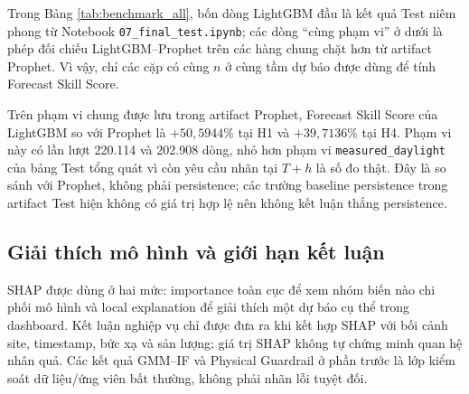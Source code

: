 \documentclass[12pt,a4paper]{article}
\begin{document}
\begin{table}[H]
\centering
\caption{Kết quả benchmark trên Test và phạm vi chung của LightGBM MAE và Prophet. Các số liệu được đọc từ artifact hiện hành và được đối chiếu với output notebook đã lưu.}
\label{tab:benchmark_all}
\small
{}
\end{table}

Trong Bảng \ref{tab:benchmark_all}, bốn dòng LightGBM đầu là kết quả Test niêm phong từ Notebook \texttt{07\_final\_test.ipynb}; các dòng ``cùng phạm vi'' ở dưới là phép đối chiếu LightGBM--Prophet trên các hàng chung chặt hơn từ artifact Prophet. Vì vậy, chỉ các cặp có cùng $n$ ở cùng tầm dự báo được dùng để tính Forecast Skill Score.

Trên phạm vi chung được lưu trong artifact Prophet, Forecast Skill Score của LightGBM so với Prophet là $+50,5944\%$ tại H1 và $+39,7136\%$ tại H4. Phạm vi này có lần lượt 220.114 và 202.908 dòng, nhỏ hơn phạm vi \texttt{measured\_daylight} của bảng Test tổng quát vì còn yêu cầu nhãn tại $T+h$ là số đo thật. Đây là so sánh với Prophet, không phải persistence; các trường baseline persistence trong artifact Test hiện không có giá trị hợp lệ nên không kết luận thắng persistence.

\subsection{Giải thích mô hình và giới hạn kết luận}
SHAP được dùng ở hai mức: importance toàn cục để xem nhóm biến nào chi phối mô hình và local explanation để giải thích một dự báo cụ thể trong dashboard. Kết luận nghiệp vụ chỉ được đưa ra khi kết hợp SHAP với bối cảnh site, timestamp, bức xạ và sản lượng; giá trị SHAP không tự chứng minh quan hệ nhân quả. Các kết quả GMM--IF và Physical Guardrail ở phần trước là lớp kiểm soát dữ liệu/ứng viên bất thường, không phải nhãn lỗi tuyệt đối.
\end{document}
